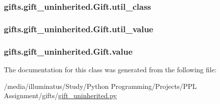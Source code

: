 \subsubsection[{\texorpdfstring{util\+\_\+class}{util_class}}]{\setlength{\rightskip}{0pt plus 5cm}gifts.\+gift\+\_\+uninherited.\+Gift.\+util\+\_\+class}\hypertarget{classgifts_1_1gift__uninherited_1_1_gift_a7fd2164d8bd791fa524e82d2ef6316aa}{}\label{classgifts_1_1gift__uninherited_1_1_gift_a7fd2164d8bd791fa524e82d2ef6316aa}
\subsubsection[{\texorpdfstring{util\+\_\+value}{util_value}}]{\setlength{\rightskip}{0pt plus 5cm}gifts.\+gift\+\_\+uninherited.\+Gift.\+util\+\_\+value}\hypertarget{classgifts_1_1gift__uninherited_1_1_gift_a640df8d6eb45f9027260eb8053bb6b43}{}\label{classgifts_1_1gift__uninherited_1_1_gift_a640df8d6eb45f9027260eb8053bb6b43}
\subsubsection[{\texorpdfstring{value}{value}}]{\setlength{\rightskip}{0pt plus 5cm}gifts.\+gift\+\_\+uninherited.\+Gift.\+value}\hypertarget{classgifts_1_1gift__uninherited_1_1_gift_aea65e2d06b96ec3ab267e4e8dd1e91ff}{}\label{classgifts_1_1gift__uninherited_1_1_gift_aea65e2d06b96ec3ab267e4e8dd1e91ff}


The documentation for this class was generated from the following file\+:\begin{DoxyCompactItemize}
\item 
/media/illuminatus/\+Study/\+Python Programming/\+Projects/\+P\+P\+L Assignment/gifts/\hyperlink{gift__uninherited_8py}{gift\+\_\+uninherited.\+py}\end{DoxyCompactItemize}
